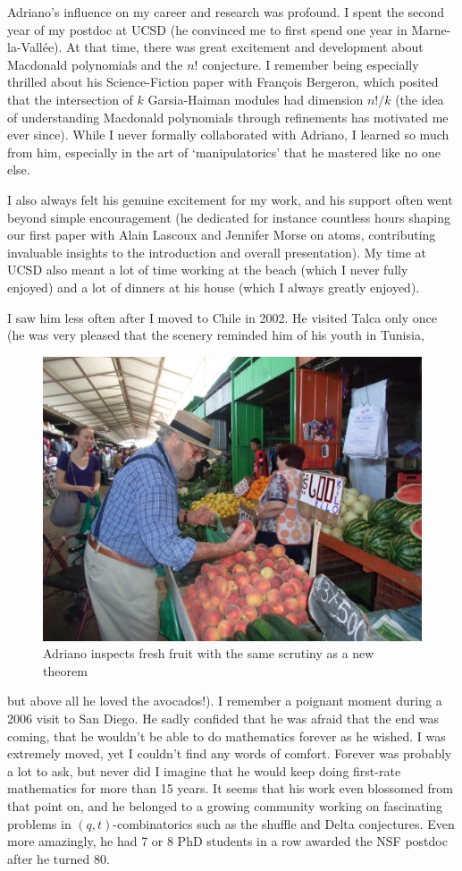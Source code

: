 \documentclass{notices}
\begin{document}
Adriano's influence on my career and research was profound. I spent the second year of my postdoc at UCSD (he convinced me to first spend one year in Marne-la-Vallée). At that time, there was great excitement and development about Macdonald polynomials and  the $n!$ conjecture. I remember being especially thrilled about his Science-Fiction paper with Fran\c{c}ois Bergeron, which posited that the intersection of $k$ Garsia-Haiman modules had dimension $n!/k$ (the idea of understanding Macdonald polynomials through refinements has motivated me ever since). While I never formally collaborated with Adriano, I learned so much from him, especially in the art of `manipulatorics' that he mastered like no one else. 

I also always felt his genuine excitement for my work, and  his support often went beyond simple encouragement (he dedicated for instance countless hours shaping our first paper with Alain Lascoux and Jennifer Morse on atoms, contributing invaluable insights to the introduction and overall presentation). My time at UCSD also meant a lot of time working at the beach (which I never fully enjoyed) and a lot of dinners at his house (which I always greatly enjoyed).

I saw him less often after I moved to Chile in 2002.  
He visited Talca only once (he was very pleased that the scenery reminded him of his youth in Tunisia, 
  \begin{figure}
    \centering
    \includegraphics[width=.95\linewidth]{adrianochile.JPG}
{\footnotesize Adriano inspects fresh fruit with the same scrutiny as
a new theorem}
\end{figure}
but above all he loved the avocados!). I remember a poignant moment during a 2006 visit to San Diego. He sadly confided that he was afraid that the end was coming, that he wouldn't be able to do mathematics forever as he wished. I was extremely moved, yet I couldn't find any words of comfort. Forever was probably a lot to ask, but never did I imagine that he would keep doing first-rate mathematics for more than 15 years.  It seems that his work  even blossomed from that point on, and he belonged to a growing community working on fascinating problems in $(q,t)$-combinatorics such as the shuffle and Delta conjectures. 
Even more amazingly, he had 7 or 8 PhD students in a row awarded the NSF postdoc after he turned 80.
\end{document}
